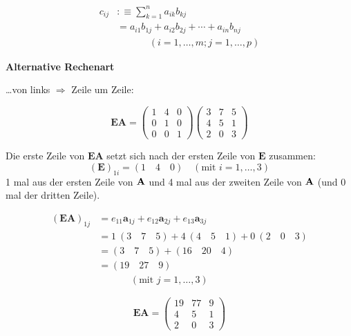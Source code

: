     	\begin{falg}
        	\begin{align*}
        		c_{ij} & :\equiv \sum_{k=1}^{n} a_{ik} b_{kj} \\
        		& = a_{i1} b_{1j} + a_{i2} b_{2j} + \cdots + a_{in} b_{nj} \\
        		&\mathrel{\phantom{=}} \qquad (i = 1, \dots ,m; j = 1, \dots ,p) 
        	\end{align*}
        \end{falg}
    
    	
    	\textbf{Alternative Rechenart}
    	
    	\dots von links $\Rightarrow$ Zeile um Zeile:
    	
    	\[
    		\mathbf{EA} =
    		\begin{pmatrix}
				1 & 4 & 0\\
				0 & 1 & 0\\
				0 & 0 & 1
 			\end{pmatrix}
 			\begin{pmatrix}
				3 & 7 & 5 \\
				4 & 5 & 1 \\
				2 & 0 & 3
			\end{pmatrix}
    	\]
    	
    	Die erste Zeile von $\mathbf{EA}$ setzt sich nach der ersten Zeile von 
    	$\mathbf{E}$ zusammen: 
    	\[
    		(\mathbf{E})_{1i} = (1 \quad 4 \quad 0) 
    			\quad (\text{mit } i = 1,\dots ,3)
    	\]
    	1 mal aus der ersten Zeile von $\mathbf{A}$ und 4 mal aus der zweiten
    	Zeile von $\mathbf{A}$ (und 0 mal der dritten Zeile).
		
		\begin{align*}
			(\mathbf{EA})_{1j} & = e_{11} \mathbf{a}_{1j} + e_{12} \mathbf{a}_{2j}
				+ e_{13} \mathbf{a}_{3j} \\
			& = 1 \ (3 \quad 7 \quad 5) + 4 \ (4 \quad 5 \quad 1) 
				+ 0 \ (2 \quad 0 \quad 3) \\
			& = (3 \quad 7 \quad 5) + (16 \quad 20 \quad 4) \\
			& = (19 \quad 27 \quad 9) \\
			&\mathrel{\phantom{=}} \qquad (\text{mit } j = 1,\dots ,3)
		\end{align*}
		
		\[
			\mathbf{EA} =
			\begin{pmatrix}
				19 & 77 & 9 \\
				4 & 5 & 1 \\
				2 & 0 & 3
			\end{pmatrix}
		\]
		

